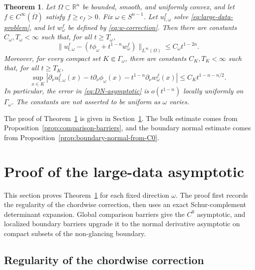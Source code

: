 \documentclass[11pt]{article}
\numberwithin{equation}{section}
\newtheorem{theorem}{Theorem}[section]
\newcommand{\R}{\mathbb R}
\newcommand{\Om}{\Omega}
\begin{document}
\begin{theorem}\label{thm:large-data-asymptotic}
Let \(\Om\subset\R^n\) be bounded, smooth, and uniformly convex, and let \(f\in C^\infty(\overline\Omega)\) satisfy \(f\ge c_f>0\).  Fix \(\omega\in S^{n-1}\).  Let \(u_{t,\omega}^f\) solve \eqref{eq:large-data-problem}, and let \(w_\omega^f\) be defined by \eqref{eq:w-correction}.  Then there are constants \(C_\omega,T_\omega<\infty\) such that, for all \(t\ge T_\omega\),
\begin{equation}\label{eq:bulk-asymptotic}
    \|u_{t,\omega}^f-(t\phi_\omega+t^{1-n}w_\omega^f)\|_{L^\infty(\Omega)}
    \le
    C_\omega t^{1-2n}.
\end{equation}
Moreover, for every compact set \(K\Subset\Gamma_\omega\), there are constants \(C_K,T_K<\infty\) such that, for all \(t\ge T_K\),
\begin{equation}\label{eq:DN-asymptotic}
    \sup_{x\in K}
    \left|
    \partial_\nu u_{t,\omega}^f(x)
    -
    t\partial_\nu\phi_\omega(x)
    -
    t^{1-n}\partial_\nu w_\omega^f(x)
    \right|
    \le
    C_Kt^{1-n-n/2}.
\end{equation}
In particular, the error in \eqref{eq:DN-asymptotic} is \(o(t^{1-n})\) locally uniformly on \(\Gamma_\omega\).  The constants are not asserted to be uniform as \(\omega\) varies.
\end{theorem}

The proof of Theorem~\ref{thm:large-data-asymptotic} is given in Section~\ref{sec:large-data-asymptotics}.  The bulk estimate comes from Proposition~\ref{prop:comparison-barriers}, and the boundary normal estimate comes from Proposition~\ref{prop:boundary-normal-from-C0}.

\section{Proof of the large-data asymptotic}\label{sec:large-data-asymptotics}

This section proves Theorem~\ref{thm:large-data-asymptotic} for each fixed direction \(\omega\).  The proof first records the regularity of the chordwise correction, then uses an exact Schur-complement determinant expansion.  Global comparison barriers give the \(C^0\) asymptotic, and localized boundary barriers upgrade it to the normal derivative asymptotic on compact subsets of the non-glancing boundary.

\subsection{Regularity of the chordwise correction}\label{subsec:regularity-chordwise-correction}
\end{document}
